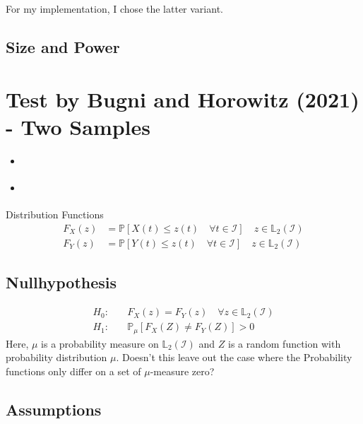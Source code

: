 \documentclass[11pt,twoside,a4paper]{article}
\theoremstyle{MAstyle} \newtheorem{assumption}{Assumption}
\theoremstyle{MAstyle} \newtheorem{definition}{Definition}
\begin{document}
			For my implementation, I chose the latter variant.
	
		\subsection{Size and Power}
		
	\section{Test by Bugni and Horowitz (2021) - Two Samples}\label{Bugni_Horowitz_2021}
		\begin{itemize}
			\item \cite{bugni_permutation_2021}
			\item \cite{bugni_goodness--fit_2009}
		\end{itemize}
	
		Distribution Functions
		\begin{equation}
			\begin{split}
				F_X(z) &= \mathbb{P}\left[X(t) \leq z(t) \quad \forall t \in \mathcal{I}\right] \quad z \in \mathbb{L}_2(\mathcal{I})\\
				F_Y(z) &= \mathbb{P}\left[Y(t) \leq z(t) \quad \forall t \in \mathcal{I}\right] \quad z \in \mathbb{L}_2(\mathcal{I})
			\end{split}
		\end{equation}
	
		\subsection{Nullhypothesis}
			\begin{equation}
				\begin{split}
					H_0: \quad &F_X(z) = F_Y(z) \quad \forall z \in \mathbb{L}_2(\mathcal{I}) \\
					H_1: \quad &\mathbb{P}_{\mu}\left[F_X(Z) \neq F_Y(Z)\right] > 0
				\end{split}
			\end{equation}
			Here, $\mu$ is a probability measure on $\mathbb{L}_2(\mathcal{I})$ and $Z$ is a random function with probability distribution $\mu$. {\color{red} Doesn't this leave out the case where the Probability functions only differ on a set of $\mu$-measure zero?}
		
		\subsection{Assumptions}
		
\end{document}
